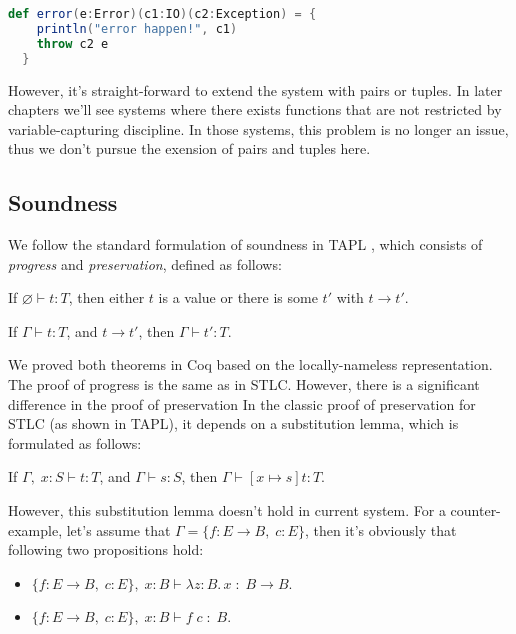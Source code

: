 \begin{lstlisting}[language=Scala]
  def error(e:Error)(c1:IO)(c2:Exception) = {
    println("error happen!", c1)
    throw c2 e
  }
\end{lstlisting}

However, it's straight-forward to extend the system with pairs or
tuples. In later chapters we'll see systems where there exists
functions that are not restricted by variable-capturing discipline.
In those systems, this problem is no longer an issue, thus we don't
pursue the exension of pairs and tuples here.

\subsection{Soundness}

We follow the standard formulation of soundness in TAPL
\cite{pierce2002types}, which consists of \emph{progress} and
\emph{preservation}, defined as follows:

\begin{theorem}[Progress]
If $\varnothing \vdash t : T$, then either $t$ is a value or there is some
$t'$ with $t \longrightarrow t'$.
\end{theorem}

\begin{theorem}[Preservation]
If $\Gamma \vdash t : T$, and $t \longrightarrow t'$, then $\Gamma
\vdash t' : T$.
\end{theorem}

We proved both theorems in Coq based on the locally-nameless
representation. The proof of progress is the same as in STLC. However,
there is a significant difference in the proof of preservation In the
classic proof of preservation for STLC (as shown in TAPL), it depends
on a substitution lemma, which is formulated as follows:

\begin{lemma}
If $\Gamma,\; x:S \vdash t : T$, and $\Gamma \vdash s : S$, then $\Gamma
\vdash [x \mapsto s]t : T$.
\end{lemma}

However, this substitution lemma doesn't hold in current system. For a
counter-example, let's assume that $\Gamma = \{f: E \to B,\;
  c:E\}$, then it's obviously that following two propositions hold:

\begin{itemize}
\item $\{f: E \to B,\; c:E\},\; x:B \vdash \lambda z:B.\,x \; : \; B \to B$.
\item $\{f: E \to B,\; c:E\},\; x:B \vdash f \; c \; : \; B$.
\end{itemize}

